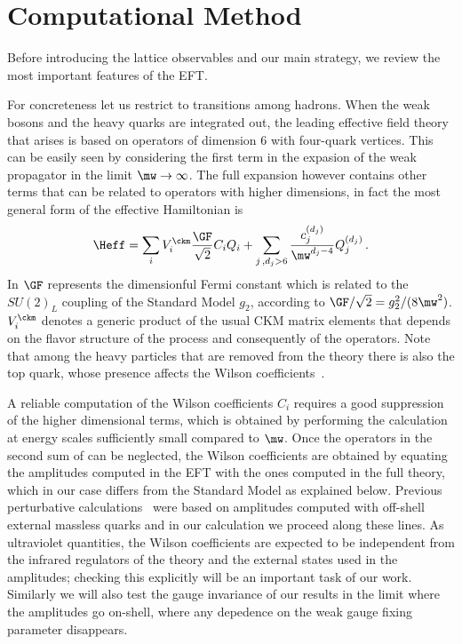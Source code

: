 \documentclass[aps,prd,twocolumn,nofootinbib,showpacs,superscriptaddress]{revtex4-1}
\begin{document}
\section{Computational Method}

Before introducing the lattice observables and our main strategy, we 
review the most important features of the EFT.

For concreteness let us restrict to transitions among 
hadrons. When the weak bosons and the heavy quarks are integrated out, 
the leading effective field theory
that arises is based on operators of dimension 6 with four-quark vertices. 
This can be easily seen
by considering the first term in the expasion of the weak propagator
in the limit $\mw \to \infty$.
The full expansion however contains other terms that can be related to 
operators with higher dimensions,
in fact the most general form of the effective Hamiltonian is
\begin{equation}
\Heff = \sum_i V^\ckm_i \frac{\GF}{\sqrt{2}} C_i Q_i 
+ \sum_{j \,, d_j>6} \frac{ c_j^{(d_j)} }{\mw^{d_j-4}} Q_j^{(d_j)} \,.
\label{eq:heff}
\end{equation}
In  $\GF$ represents the dimensionful Fermi constant 
which is related to the $SU(2)_L$ coupling of the Standard Model $g_2$, 
according to $\GF/\sqrt{2} = g_2^2 /(8 \mw^2)$.
$V^\ckm_i$ denotes a generic product of the usual CKM matrix elements that depends 
on the flavor structure of the process and consequently 
of the operators.
Note that among the heavy particles that are removed from the theory 
there is also the top quark, whose presence affects the
Wilson coefficients~\cite{Buchalla:1995vs,Gorbahn:2004my}.

A reliable computation of the Wilson coefficients $C_i$ 
requires a good suppression of the higher dimensional terms, 
which is obtained by performing the calculation
at energy scales sufficiently small compared to $\mw$.
Once the operators in the second sum of  can be neglected, the Wilson coefficients 
are obtained by equating the amplitudes computed in the EFT 
with the ones computed in the full theory, which in our case
differs from the Standard Model as explained below. 
Previous perturbative calculations~\cite{Buchalla:1995vs}
were based on amplitudes computed with off-shell 
external massless quarks and in our calculation
we proceed along these lines.
As ultraviolet quantities, the Wilson coefficients
are expected to be independent from the infrared regulators
of the theory and 
the external states used in the amplitudes;
checking this explicitly will be an important task of our work.
Similarly we will also test the gauge invariance of our results
in the limit where the amplitudes go on-shell,
where any depedence on the weak gauge fixing parameter disappears.\\
\end{document}
